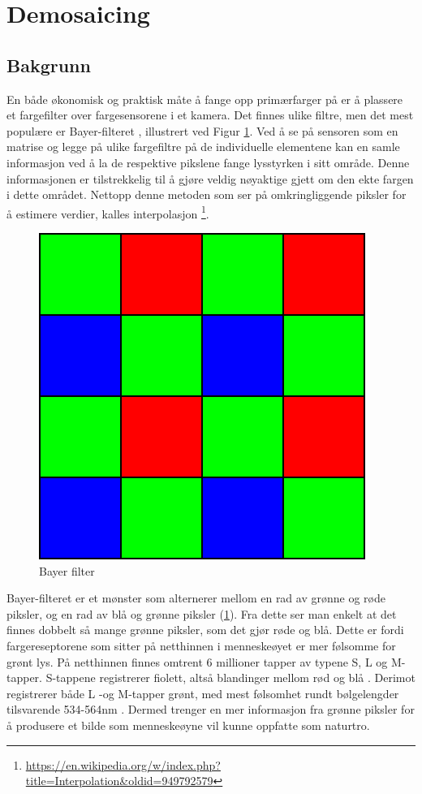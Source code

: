 \section{Demosaicing}
\label{sec:Demosaicing}
\subsection{Bakgrunn}
En både økonomisk og praktisk måte å fange opp primærfarger på er å plassere et fargefilter over fargesensorene i et kamera. Det finnes ulike filtre, men det mest populære er Bayer-filteret \cite{Demosaic38:online}, illustrert ved Figur \ref{Figur 2}. Ved å se på sensoren som en matrise og legge på ulike fargefiltre på de individuelle elementene kan en samle informasjon ved å la de respektive pikslene fange lysstyrken i sitt område. Denne informasjonen er tilstrekkelig til å gjøre veldig nøyaktige gjett om den ekte fargen i dette området. Nettopp denne metoden som ser på omkringliggende piksler for å estimere verdier, kalles interpolasjon \footnote{\url{https://en.wikipedia.org/w/index.php?title=Interpolation&oldid=949792579}}.
\begin{figure}
\begin{center}
    \includegraphics[width=0.3\columnwidth]{bilder/Bayer_pattern.png}
    \caption{Bayer filter \label{Figur 2}} 
\end{center}
\end{figure}
Bayer-filteret er et mønster som alternerer mellom en rad av grønne og røde piksler, og en rad av blå og grønne piksler (\ref{Figur 2}). Fra dette ser man enkelt at det finnes dobbelt så mange grønne piksler, som det gjør røde og blå. Dette er fordi fargereseptorene som sitter på netthinnen i menneskeøyet er mer følsomme for grønt lys. På netthinnen finnes omtrent 6 millioner tapper av typene S, L og M-tapper. S-tappene registrerer fiolett, altså blandinger mellom rød og blå \cite{wiki:lilla}. Derimot registrerer både L -og M-tapper grønt, med mest følsomhet rundt bølgelengder tilsvarende 534-564nm \cite{wiki:coneCell}. Dermed trenger en mer informasjon fra grønne piksler for å produsere et bilde som menneskeøyne vil kunne oppfatte som naturtro.

